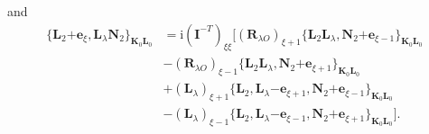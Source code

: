 \documentclass[a4paper,11pt,twoside,openright]{book}
\begin{document}
and
\begin{align}
  \label{eq:recurrence-angular-ket}
    \{\boldsymbol{L}_{2}\mathrm{+}\boldsymbol{e}_{\xi},%
    \boldsymbol{L}_{\lambda}\boldsymbol{N}_{2}\}_{\boldsymbol{K}_{0}\boldsymbol{L}_{0}}
  &=\text{i}\left(\mathbf{I}^{-T}\right)_{\xi\xi}\bigl[(\boldsymbol{R}_{\lambda O})_{\xi+1}%
    \{\boldsymbol{L}_{2}\boldsymbol{L}_{\lambda},%
      \boldsymbol{N}_{2}\mathrm{+}\boldsymbol{e}_{\xi-1}\}_{\boldsymbol{K}_{0}\boldsymbol{L}_{0}}\\
  &-(\boldsymbol{R}_{\lambda O})_{\xi-1}%
    \{\boldsymbol{L}_{2}\boldsymbol{L}_{\lambda},%
      \boldsymbol{N}_{2}\mathrm{+}\boldsymbol{e}_{\xi+1}\}_{\boldsymbol{K}_{0}\boldsymbol{L}_{0}}\nonumber\\
  &+(\boldsymbol{L}_{\lambda})_{\xi+1}%
    \{\boldsymbol{L}_{2},\boldsymbol{L}_{\lambda}\mathrm{-}\boldsymbol{e}_{\xi+1},%
      \boldsymbol{N}_{2}\mathrm{+}\boldsymbol{e}_{\xi-1}\}_{\boldsymbol{K}_{0}\boldsymbol{L}_{0}}\nonumber\\
  &-(\boldsymbol{L}_{\lambda})_{\xi-1}%
    \{\boldsymbol{L}_{2},\boldsymbol{L}_{\lambda}\mathrm{-}\boldsymbol{e}_{\xi-1},%
      \boldsymbol{N}_{2}\mathrm{+}\boldsymbol{e}_{\xi+1}\}_{\boldsymbol{K}_{0}\boldsymbol{L}_{0}}\bigr].\nonumber
\end{align}
\end{document}
